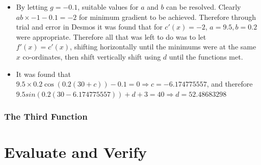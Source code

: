 \documentclass[11pt, letterpaper]{article}
\begin{document}
\begin{itemize}
	\item By letting $g=-0.1$, suitable values for $a$ and $b$ can be resolved. Clearly $ab\times-1-0.1=-2$ for minimum gradient to be achieved. Therefore through trial and error in Desmos it was found that for $c'(x)=-2$, $a=9.5,b=0.2$ were appropriate. Therefore all that was left to do was to let $f'(x)=c'(x)$, shifting horizontally until the minimums were at the same $x$ co-ordinates, then shift vertically shift using $d$ until the functions met.  
	\item It was found  that $9.5\times0.2\cos (0.2(30+c))-0.1=0 \Rightarrow c=-6.174775557$, and therefore $9.5sin(0.2(30-6.174775557))+d+3=40 \Rightarrow d=52.48683298$
\end{itemize}
\subsubsection{The Third Function}







\section{Evaluate and Verify}
\end{document}
